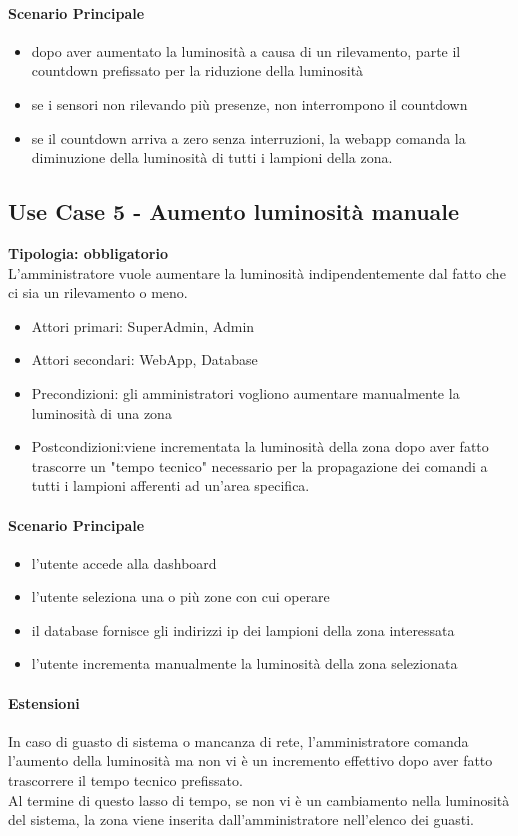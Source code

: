 \documentclass[12pt]{article}
\begin{document}
\paragraph{Scenario Principale}
\begin{itemize}
	\item dopo aver aumentato la luminosità a causa di un rilevamento, parte il countdown prefissato per la riduzione della luminosità
	\item se i sensori non rilevando più presenze, non interrompono il countdown
	\item se il countdown arriva a zero senza interruzioni, la webapp comanda la diminuzione della luminosità di tutti i lampioni della zona.
\end{itemize}

\subsection{Use Case 5 - Aumento luminosità manuale}
\textbf{Tipologia: obbligatorio} \\
L'amministratore vuole aumentare la luminosità indipendentemente dal fatto che ci sia un rilevamento o meno.
\begin{itemize}
	\item Attori primari: SuperAdmin, Admin
	\item Attori secondari: WebApp, Database
	\item Precondizioni: gli amministratori vogliono aumentare manualmente la luminosità di una zona
	\item Postcondizioni:viene incrementata la luminosità della zona dopo aver fatto trascorre un "tempo tecnico" necessario per la propagazione dei comandi a tutti i lampioni afferenti ad un'area specifica.
\end{itemize}
\paragraph{Scenario Principale}
\begin{itemize}
	\item l'utente accede alla dashboard
	\item l'utente seleziona una o più zone con cui operare
	\item il database fornisce gli indirizzi ip dei lampioni della zona interessata
	\item l'utente incrementa manualmente la luminosità della zona selezionata
\end{itemize}
\paragraph{Estensioni} In caso di guasto di sistema o mancanza di rete, l'amministratore comanda l'aumento della luminosità ma non vi è un incremento effettivo dopo aver fatto trascorrere il tempo tecnico prefissato.\\
Al termine di questo lasso di tempo, se non vi è un cambiamento nella luminosità del sistema, la zona viene inserita dall'amministratore nell'elenco dei guasti. 
\end{document}
